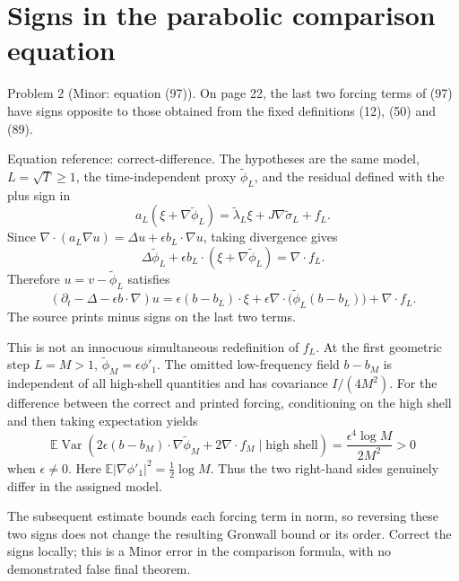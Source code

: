 \documentclass[10pt]{article}
\begin{document}
\section*{Signs in the parabolic comparison equation}
Problem 2 (Minor: equation (97)).  On page 22, the last two forcing terms of (97) have signs opposite to those obtained from the fixed definitions (12), (50) and (89).\par
Equation reference: correct-difference. The hypotheses are the same model, \(L=\sqrt T\geq1\), the time-independent proxy \(\widetilde\phi_L\), and the residual defined with the plus sign in \[a_L(\xi+\nabla\widetilde\phi_L)
   =\widetilde\lambda_L\xi+J\nabla\widetilde\sigma_L+f_L.\] Since \(\nabla\cdot(a_L\nabla u)=\Delta u+\epsilon b_L\cdot\nabla u\), taking divergence gives \[\Delta\widetilde\phi_L+
 \epsilon b_L\cdot(\xi+\nabla\widetilde\phi_L)=\nabla\cdot f_L.\] Therefore \(u=v-\widetilde\phi_L\) satisfies \[
 (\partial_t-\Delta-\epsilon b\cdot\nabla)u
 =\epsilon(b-b_L)\cdot\xi
  +\epsilon\nabla\cdot\bigl(\widetilde\phi_L(b-b_L)\bigr)
  +\nabla\cdot f_L .\] The source prints minus signs on the last two terms.\par
This is not an innocuous simultaneous redefinition of \(f_L\). At the first geometric step \(L=M>1\), \(\widetilde\phi_M=\epsilon\phi'_1\). The omitted low-frequency field \(b-b_M\) is independent of all high-shell quantities and has covariance \(I/(4M^2)\). For the difference between the correct and printed forcing, conditioning on the high shell and then taking expectation yields \[\mathbb E\operatorname{Var}\!\left(
 2\epsilon(b-b_M)\cdot\nabla\widetilde\phi_M
       +2\nabla\cdot f_M\mid\text{high shell}\right)
   =\frac{\epsilon^4\log M}{2M^2}>0\] when \(\epsilon\ne0\). Here \(\mathbb E|\nabla\phi'_1|^2=\tfrac12\log M\). Thus the two right-hand sides genuinely differ in the assigned model.\par
The subsequent estimate bounds each forcing term in norm, so reversing these two signs does not change the resulting Gronwall bound or its order. Correct the signs locally; this is a Minor error in the comparison formula, with no demonstrated false final theorem.\par
\end{document}
